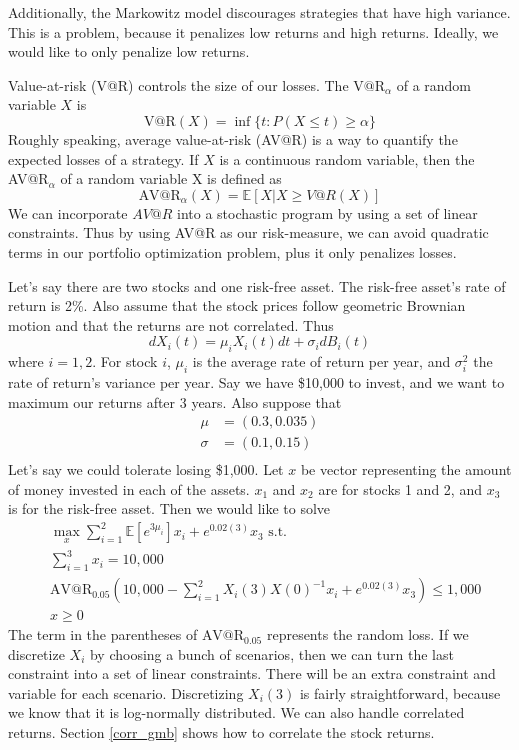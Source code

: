 \documentclass{amsart}
\theoremstyle{definition}
\theoremstyle{remark}
\begin{document}
Additionally, the Markowitz model discourages strategies that have high variance. This is a problem, because it penalizes low returns and high returns. Ideally, we would like to only penalize low returns.

Value-at-risk (V@R) controls the size of our losses. The $\text{V@R}_\alpha$ of a random variable $X$ is
\begin{equation*}
\text{V@R}(X) = \inf\{t : P(X \le t) \ge \alpha\}
\end{equation*}
Roughly speaking, average value-at-risk (AV@R) is a way to quantify the expected losses of a strategy. If $X$ is a continuous random variable, then the AV@R$_\alpha$ of a random variable X is defined as
\begin{equation*}
\text{AV@R}_\alpha (X) = \mathbb{E}[X | X \ge V@R(X)]
\end{equation*}
We can incorporate $AV@R$ into a stochastic program by using a set of linear constraints. Thus by using AV@R as our risk-measure, we can avoid quadratic terms in our portfolio optimization problem, plus it only penalizes losses.

Let's say there are two stocks and one risk-free asset. The risk-free asset's rate of return is 2\%. Also assume that the stock prices follow geometric Brownian motion and that the returns are not correlated. Thus
\begin{equation*}
dX_i(t) = \mu_i X_i(t) dt + \sigma_i dB_i(t)
\end{equation*}
where $i=1,2$. For stock $i$, $\mu_i$ is the average rate of return per year, and $\sigma_i^2$ the rate of return's variance per year.
Say we have \$10,000 to invest, and we want to maximum our returns after 3 years. Also suppose that
\begin{align*}
\mu &= (0.3, 0.035)\\
\sigma &= (0.1, 0.15)\\
\end{align*}
Let's say we could tolerate losing \$1,000. Let $x$ be vector representing the amount of money invested in each of the assets. $x_1$ and $x_2$ are for stocks 1 and 2, and $x_3$ is for the risk-free asset. Then we would like to solve
\begin{align*}
&\max_x \sum_{i=1}^2\mathbb{E}[e^{3\mu_i}]x_i + e^{0.02(3)}x_3 \text{ s.t.}\\
&\sum_{i=1}^3 x_i = 10,000\\
&\text{AV@R}_{0.05}\left(10,000 - \sum_{i=1}^2 X_i(3) X(0)^{-1} x_i + e^{0.02(3)} x_3\right) \le 1,000\\
&x \ge 0
\end{align*}
The term in the parentheses of $\text{AV@R}_{0.05}$ represents the random loss. If we discretize $X_i$ by choosing a bunch of scenarios, then we can turn the last constraint into a set of linear constraints. There will be an extra constraint and variable for each scenario. Discretizing $X_i(3)$ is fairly straightforward, because we know that it is log-normally distributed. We can also handle correlated returns. Section \ref{corr_gmb} shows how to correlate the stock returns. 
\end{document}
